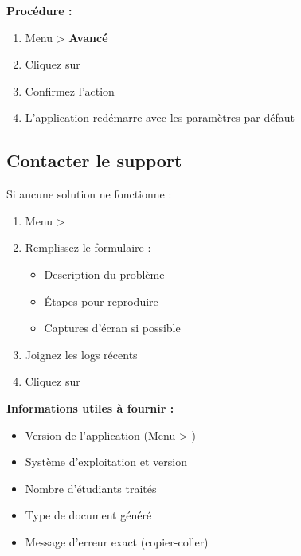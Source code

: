 \textbf{Procédure :}
\begin{enumerate}[leftmargin=*]
    \item Menu  > \textbf{Avancé}
    \item Cliquez sur 
    \item Confirmez l'action
    \item L'application redémarre avec les paramètres par défaut
\end{enumerate}

\subsection{Contacter le support}

Si aucune solution ne fonctionne :

\begin{enumerate}[leftmargin=*]
    \item Menu  > 
    \item Remplissez le formulaire :
    \begin{itemize}
        \item Description du problème
        \item Étapes pour reproduire
        \item Captures d'écran si possible
    \end{itemize}
    \item Joignez les logs récents
    \item Cliquez sur 
\end{enumerate}

\textbf{Informations utiles à fournir :}
\begin{itemize}[leftmargin=*]
    \item Version de l'application (Menu  > )
    \item Système d'exploitation et version
    \item Nombre d'étudiants traités
    \item Type de document généré
    \item Message d'erreur exact (copier-coller)
\end{itemize}

\newpage
